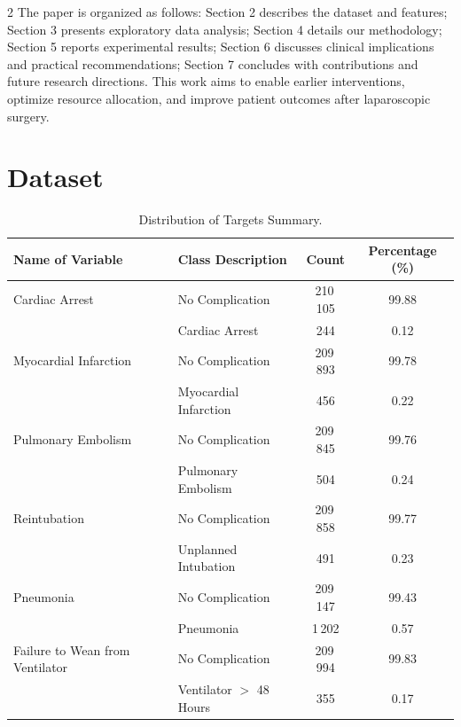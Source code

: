 \documentclass[bst/sn-nature]{sn-jnl}
\begin{document}
\begin{multicols}{2}
The paper is organized as follows: Section 2 describes the dataset and features; Section 3 presents exploratory data analysis; Section 4 details our methodology; Section 5 reports experimental results; Section 6 discusses clinical implications and practical recommendations\cite{promises4}; Section 7 concludes with contributions and future research directions. This work aims to enable earlier interventions, optimize resource allocation, and improve patient outcomes after laparoscopic surgery.

\section{Dataset}

\begin{table}[t]
\centering
\caption{Distribution of Targets Summary.}
\label{tab:target_distribution_summary}
\begin{tabular}{llcc}
\toprule
\textbf{Name of Variable} & \textbf{Class Description} & \textbf{Count} & \textbf{Percentage (\%)} \\
\midrule
Cardiac Arrest & No Complication      & 210\,105 & 99.88 \\
               & Cardiac Arrest        & 244     & 0.12  \\
Myocardial Infarction & No Complication      & 209\,893 & 99.78 \\
                      & Myocardial Infarction & 456     & 0.22  \\
Pulmonary Embolism & No Complication       & 209\,845 & 99.76 \\
                   & Pulmonary Embolism    & 504     & 0.24  \\
Reintubation & No Complication        & 209\,858 & 99.77 \\
             & Unplanned Intubation   & 491     & 0.23  \\
Pneumonia & No Complication           & 209\,147 & 99.43 \\
          & Pneumonia                 & 1\,202   & 0.57  \\
Failure to Wean from Ventilator & No Complication        & 209\,994 & 99.83 \\
                                & Ventilator $>$ 48 Hours & 355     & 0.17  \\
\bottomrule
\end{tabular}
\end{table}



\end{multicols}
\end{document}
